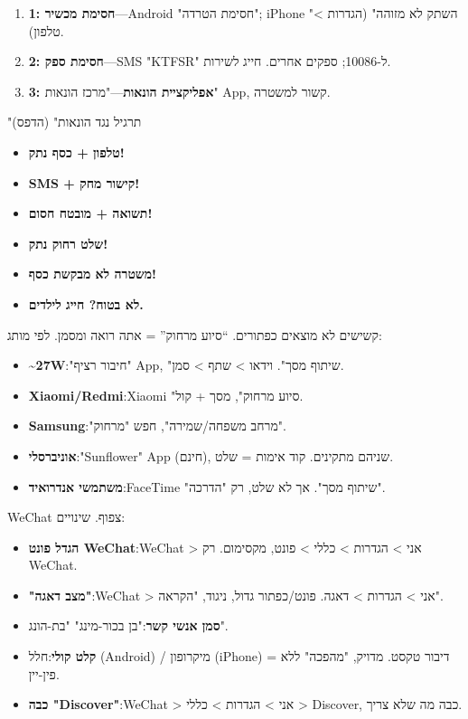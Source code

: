 
\begin{enumerate}
  \item \textbf{1: חסימת מכשיר}—Android "חסימת הטרדה"; iPhone "השתק לא מזוהה" (הגדרות > טלפון).
  \item \textbf{2: חסימת ספק}—SMS "KTFSR" ל-10086; ספקים אחרים. חייג לשירות.
  \item \textbf{3: אפליקציית הונאות}—"מרכז הונאות" App, קשור למשטרה.
\end{enumerate}

\begin{tcbwarn}{"תרגיל נגד הונאות" (הדפס)}
\begin{itemize}
  \item \textbf{טלפון + כסף נתק!}
  \item \textbf{SMS + קישור מחק!}
  \item \textbf{תשואה + מובטח חסום!}
  \item \textbf{שלט רחוק נתק!}
  \item \textbf{משטרה לא מבקשת כסף!}
  \item \textbf{לא בטוח? חייג לילדים.}
\end{itemize}

\end{tcbwarn}


קשישים לא מוצאים כפתורים. “סיוע מרחוק” = אתה רואה ומסמן. לפי מותג:

\begin{itemize}
  \item \textbf{\textasciitilde{}27W}:"חיבור רציף" App, "שיתוף מסך". וידאו > שתף > סמן.
  \item \textbf{Xiaomi/Redmi}:Xiaomi "סיוע מרחוק", מסך + קול.
  \item \textbf{Samsung}:"מרחב משפחה/שמירה", חפש "מרחוק".
  \item \textbf{אוניברסלי}:"Sunflower" App (חינם), שניהם מתקינים. קוד אימות = שלט.
  \item \textbf{משתמשי אנדרואיד}:FaceTime "שיתוף מסך". אך לא שלט, רק "הדרכה".
\end{itemize}


WeChat צפוף. שינויים:

\begin{itemize}
  \item \textbf{הגדל פונט WeChat}:WeChat > אני > הגדרות > כללי > פונט, מקסימום. רק WeChat.
  \item \textbf{"מצב דאגה"}:WeChat > אני > הגדרות > דאגה. פונט/כפתור גדול, ניגוד, "הקראה".
  \item \textbf{סמן אנשי קשר}:"בן בכור-מינג" "בת-הונג".
  \item \textbf{קלט קולי}:חלל (Android) / מיקרופון (iPhone) = דיבור טקסט. מדויק, "מהפכה" ללא פין-יין.
  \item \textbf{כבה "Discover"}:WeChat > אני > הגדרות > כללי > Discover, כבה מה שלא צריך.
\end{itemize}

